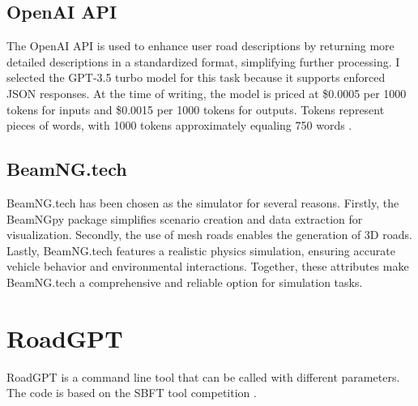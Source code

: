 \subsection{OpenAI API}
The OpenAI API is used to enhance user road descriptions by returning more detailed descriptions in a standardized format, simplifying further processing. I selected the GPT-3.5 turbo model for this task because it supports enforced JSON responses. At the time of writing, the model is priced at \$0.0005 per 1000 tokens for inputs and \$0.0015 per 1000 tokens for outputs. Tokens represent pieces of words, with 1000 tokens approximately equaling 750 words \cite{OpenAIPricing}.

\subsection{BeamNG.tech}
BeamNG.tech has been chosen as the simulator for several reasons. Firstly, the BeamNGpy package simplifies scenario creation and data extraction for visualization. Secondly, the use of mesh roads enables the generation of 3D roads. Lastly, BeamNG.tech features a realistic physics simulation, ensuring accurate vehicle behavior and environmental interactions. Together, these attributes make BeamNG.tech a comprehensive and reliable option for simulation tasks.






\section{RoadGPT}
RoadGPT is a command line tool that can be called with different parameters. The code is based on the SBFT tool competition \cite{SBFT}.

